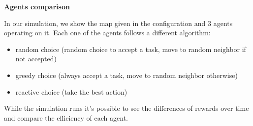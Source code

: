 \documentclass[11pt,a4paper]{article}
\begin{document}
\bigskip
\textbf{Agents comparison}

In our simulation, we show the map given in the configuration and 3 agents
operating on it. Each one of the agents follows a different algorithm:

\begin{itemize}
    \item{random choice (random choice to accept a task, move to random neighbor if not accepted)}
    \item{greedy choice (always accept a task, move to random neighbor otherwise)}
    \item{reactive choice (take the best action)}
\end{itemize}

While the simulation runs it's possible to see the differences of rewards over
time and compare the efficiency of each agent.
\end{document}
